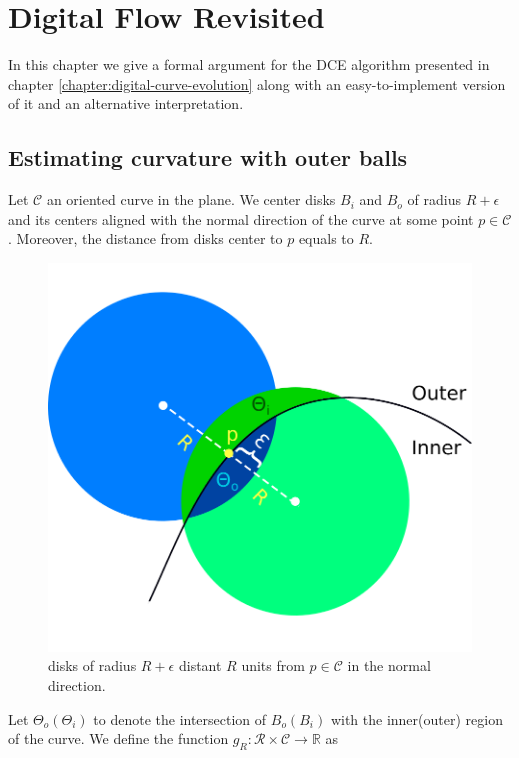 \chapter{Digital Flow Revisited}
\label{chapter:digital-flow-revisited}

In this chapter we give a formal argument for the DCE algorithm presented in chapter \ref{chapter:digital-curve-evolution} along with an easy-to-implement version of it and an alternative interpretation.

\section{Estimating curvature with outer balls}

Let $\mathcal{C}$ an oriented curve in the plane. We center disks $B_i$ and $B_o$ of radius $R + \epsilon$ and its centers aligned with the normal direction of the curve at some point $p \in \mathcal{C}$. Moreover, the distance from disks center to $p$ equals to $R$.

\begin{figure}
\center
\includegraphics[scale=0.35]{figures/appendix-max-energy/r-separated-disks.png}
\caption{disks of radius $R+\epsilon$ distant $R$ units from $p\in \mathcal{C}$ in the normal direction.}
\label{fig:r-separated-disks}
\end{figure}

Let $\Theta_o (\Theta_i)$ to denote the intersection of $B_o(B_i)$ with the inner(outer) region of the curve. We define the function $g_R:\mathcal{R} \times \mathcal{C}\rightarrow \mathbb{R}$ as


